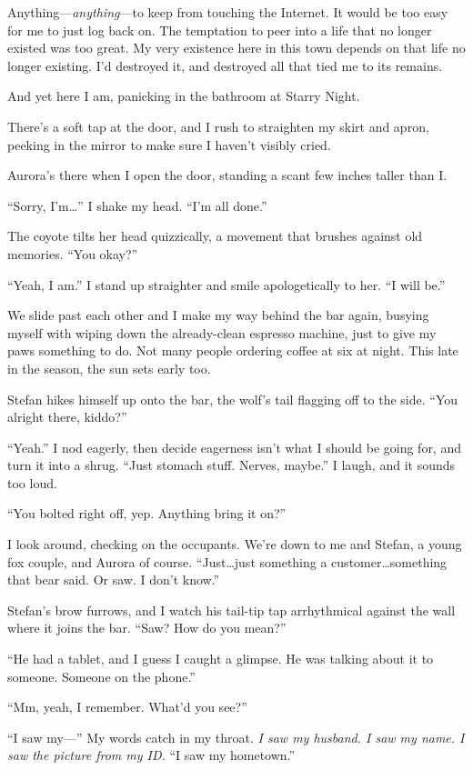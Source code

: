 Anything---\emph{anything}---to keep from touching the Internet. It would be too easy for me to just log back on. The temptation to peer into a life that no longer existed was too great. My very existence here in this town depends on that life no longer existing. I'd destroyed it, and destroyed all that tied me to its remains.

And yet here I am, panicking in the bathroom at Starry Night.

There's a soft tap at the door, and I rush to straighten my skirt and apron, peeking in the mirror to make sure I haven't visibly cried.

Aurora's there when I open the door, standing a scant few inches taller than I.

``Sorry, I'm\ldots{}'' I shake my head. ``I'm all done.''

The coyote tilts her head quizzically, a movement that brushes against old memories. ``You okay?''

``Yeah, I am.'' I stand up straighter and smile apologetically to her. ``I will be.''

We slide past each other and I make my way behind the bar again, busying myself with wiping down the already-clean espresso machine, just to give my paws something to do. Not many people ordering coffee at six at night. This late in the season, the sun sets early too.

Stefan hikes himself up onto the bar, the wolf's tail flagging off to the side. ``You alright there, kiddo?''

``Yeah.'' I nod eagerly, then decide eagerness isn't what I should be going for, and turn it into a shrug. ``Just stomach stuff. Nerves, maybe.'' I laugh, and it sounds too loud.

``You bolted right off, yep. Anything bring it on?''

I look around, checking on the occupants. We're down to me and Stefan, a young fox couple, and Aurora of course. ``Just\ldots{}just something a customer\ldots{}something that bear said. Or saw. I don't know.''

Stefan's brow furrows, and I watch his tail-tip tap arrhythmical against the wall where it joins the bar. ``Saw? How do you mean?''

``He had a tablet, and I guess I caught a glimpse. He was talking about it to someone. Someone on the phone.''

``Mm, yeah, I remember. What'd you see?''

``I saw my---'' My words catch in my throat. \emph{I saw my husband. I saw my name. I saw the picture from my ID.} ``I saw my hometown.''

